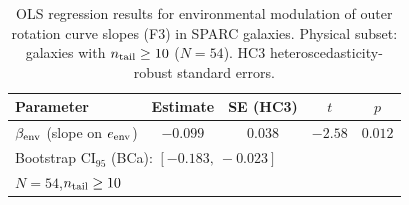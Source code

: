 
\begin{table}[ht]
\centering
\caption{OLS regression results for environmental modulation of outer rotation curve slopes (F3)
in SPARC galaxies. Physical subset: galaxies with $n_{\rm tail} \geq 10$ ($N = 54$).
HC3 heteroscedasticity-robust standard errors.}
\label{tab:env_results}
\begin{tabular}{lcccc}
\hline\hline
Parameter & Estimate & SE (HC3) & $t$ & $p$ \\
\hline
$\beta_{\rm env}$ (slope on $e_{\rm env}$) & $-0.099$ & $0.038$ & $-2.58$ & $0.012$ \\
\hline
\multicolumn{5}{l}{Bootstrap CI$_{95}$ (BCa): $[-0.183,\ -0.023]$} \\
\multicolumn{5}{l}{$N = 54$,\quad $n_{\rm tail} \geq 10$} \\
\hline
\end{tabular}
\end{table}
